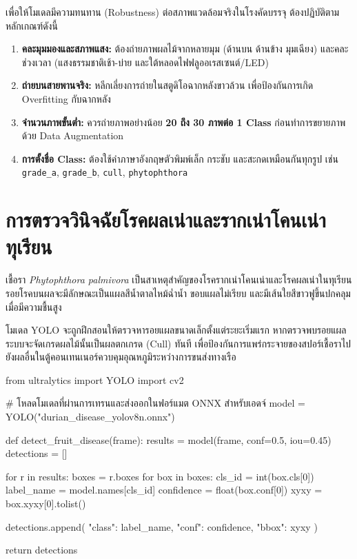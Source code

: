 เพื่อให้โมเดลมีความทนทาน (Robustness) ต่อสภาพแวดล้อมจริงในโรงคัดบรรจุ ต้องปฏิบัติตามหลักเกณฑ์ดังนี้
\begin{enumerate}[leftmargin=1.5em]
    \item \textbf{คละมุมมองและสภาพแสง:} ต้องถ่ายภาพผลไม้จากหลายมุม (ด้านบน ด้านข้าง มุมเฉียง) และคละช่วงเวลา (แสงธรรมชาติเช้า-บ่าย และใต้หลอดไฟฟลูออเรสเซนต์/LED)
    \item \textbf{ถ่ายบนสายพานจริง:} หลีกเลี่ยงการถ่ายในสตูดิโอฉากหลังขาวล้วน เพื่อป้องกันการเกิด Overfitting กับฉากหลัง
    \item \textbf{จำนวนภาพขั้นต่ำ:} ควรถ่ายภาพอย่างน้อย \textbf{20 ถึง 30 ภาพต่อ 1 Class} ก่อนทำการขยายภาพด้วย Data Augmentation
    \item \textbf{การตั้งชื่อ Class:} ต้องใช้คำภาษาอังกฤษตัวพิมพ์เล็ก กระชับ และสะกดเหมือนกันทุกรูป เช่น \texttt{grade\_a}, \texttt{grade\_b}, \texttt{cull}, \texttt{phytophthora}
\end{enumerate}

\section{การตรวจวินิจฉัยโรคผลเน่าและรากเน่าโคนเน่าทุเรียน}

เชื้อรา \textit{Phytophthora palmivora} เป็นสาเหตุสำคัญของโรครากเน่าโคนเน่าและโรคผลเน่าในทุเรียน รอยโรคบนผลจะมีลักษณะเป็นแผลสีน้ำตาลไหม้ฉ่ำน้ำ ขอบแผลไม่เรียบ และมีเส้นใยสีขาวฟูขึ้นปกคลุมเมื่อมีความชื้นสูง

โมเดล YOLO จะถูกฝึกสอนให้ตรวจหารอยแผลขนาดเล็กตั้งแต่ระยะเริ่มแรก หากตรวจพบรอยแผล ระบบจะจัดเกรดผลไม้นั้นเป็นผลตกเกรด (Cull) ทันที เพื่อป้องกันการแพร่กระจายของสปอร์เชื้อราไปยังผลอื่นในตู้คอนเทนเนอร์ควบคุมอุณหภูมิระหว่างการขนส่งทางเรือ

\begin{pythonbox}
from ultralytics import YOLO
import cv2

# โหลดโมเดลที่ผ่านการเทรนและส่งออกในฟอร์แมต ONNX สำหรับเอดจ์
model = YOLO("durian_disease_yolov8n.onnx")

def detect_fruit_disease(frame):
    results = model(frame, conf=0.5, iou=0.45)
    detections = []
    
    for r in results:
        boxes = r.boxes
        for box in boxes:
            cls_id = int(box.cls[0])
            label_name = model.names[cls_id]
            confidence = float(box.conf[0])
            xyxy = box.xyxy[0].tolist()
            
            detections.append({
                "class": label_name,
                "conf": confidence,
                "bbox": xyxy
            })
            
    return detections
\end{pythonbox}

